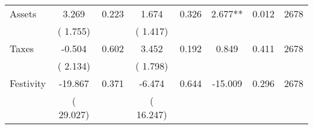 \begin{tabular}{l*{7}{c}}
 Assets       &              3.269       &        0.223  &              1.674       &        0.326  &              2.677**       &              0.012 &  2678 \\ 
                       &       (       1.755)             &                               &       (       1.417)                     &                               &                                               &                                &                      \\ 

 Taxes       &             -0.504       &        0.602  &              3.452       &        0.192  &              0.849       &              0.411 &  2678 \\ 
                       &       (       2.134)             &                               &       (       1.798)                     &                               &                                               &                                &                      \\ 

 Festivity       &            -19.867       &        0.371  &             -6.474       &        0.644  &            -15.009       &              0.296 &  2678 \\ 
                       &       (      29.027)             &                               &       (      16.247)                     &                               &                                               &                                &                      \\ 

\hline \end{tabular}